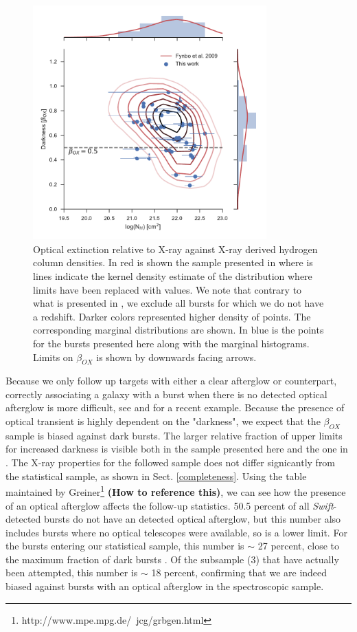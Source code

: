 \documentclass{aa}    %
\newcommand\todo[1]{\textbf{(#1)}}
\begin{document}
\begin{figure}
	\centerline{\includegraphics[width=9cm]{figures/betaOX.pdf}} \caption{Optical
	extinction relative to X-ray against X-ray derived hydrogen column densities.
	In red is shown the sample presented in \citet{Fynbo2009} where is lines
	indicate the kernel density estimate of the distribution where limits have been
	replaced with values. We note that contrary to what is presented in
	\citet{Fynbo2009}, we exclude all bursts for which we do not have a redshift.
	Darker colors represented higher density of points. The corresponding marginal
	distributions are shown. In blue is the points for the bursts presented here
	along with the marginal histograms. Limits on $\beta_{OX}$ is shown by
	downwards facing arrows.} \label{fig:betaOX}
\end{figure}

Because we only follow up targets with either a clear afterglow or counterpart,
correctly associating a galaxy with a burst when there is no detected optical
afterglow is more difficult, see \citet{Levesque2010} and \citet{Perley2017} for
a recent example. Because the presence of optical transient is highly dependent
on the "darkness", we expect that the $\beta_{OX}$ sample is biased against dark
bursts. The larger relative fraction of upper limits for increased darkness is
visible both in the sample presented here and the one in \citet{Fynbo2009}. The
X-ray properties for the followed sample does not differ signicantly from the
statistical sample, as shown in Sect. \ref{completeness}. Using the table
maintained by Greiner\footnote{http://www.mpe.mpg.de/~jcg/grbgen.html} \todo{How
to reference this}, we can see how the presence of an optical afterglow affects
the follow-up statistics. 50.5 percent of all \textit{Swift}-detected bursts do
not have an detected optical afterglow, but this number also includes bursts
where no optical telescopes were available, so is a lower limit. For the bursts
entering our statistical sample, this number is $\sim$ 27 percent, close to the
maximum fraction of dark bursts \citep{Melandri2012}. Of the subsample (3) that
have actually been attempted, this number is $\sim$ 18 percent, confirming that
we are indeed biased against bursts with an optical afterglow in the
spectroscopic sample.
\end{document}
